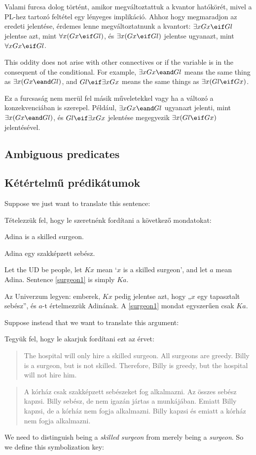 Valami furcsa dolog történt, amikor megváltoztattuk a kvantor hatókörét, mivel a PL-hez tartozó feltétel egy lényeges implikáció. Ahhoz hogy megmaradjon az eredeti jelentése, érdemes lenne megváltoztatnunk a kvantort: $\exists x Gx \eif Gl$ jelentse azt, mint $\forall x (Gx \eif Gl)$, és $\exists x (Gx \eif Gl)$ jelentse ugyanazt, mint $\forall x Gx \eif Gl$.

This oddity does not arise with other connectives or if the variable is in the consequent of the conditional. For example, $\exists x Gx \eand Gl$ means the same thing as $\exists x (Gx \eand Gl)$, and $Gl \eif \exists x Gx$ means the same things as $\exists x(Gl \eif Gx)$.

Ez a furcsaság nem merül fel másik műveletekkel vagy ha a változó a konzekvenciában is szerepel. Például, $\exists x Gx \eand Gl$ ugyanazt jelenti, mint $\exists x (Gx \eand Gl)$, és $Gl \eif \exists x Gx$ jelentése megegyezik $\exists x(Gl \eif Gx)$ jelentésével. 

\subsection*{Ambiguous predicates}
\subsection{Kétértelmű prédikátumok}

Suppose we just want to translate this sentence:

Tételezzük fel, hogy le szeretnénk fordítani a következő mondatokat:
\begin{earg}
\item[\ex{surgeon1}] Adina is a skilled surgeon.
\end{earg}
\begin{earg}
\item[\ex{surgeon1}] Adina egy szakképzett sebész.
\end{earg}
Let the UD be people, let $Kx$ mean `$x$ is a skilled surgeon', and let $a$ mean Adina. Sentence \ref{surgeon1} is simply $Ka$.

Az Univerzum legyen: emberek, $Kx$ pedig jelentse azt, hogy „$x$ egy tapasztalt sebész”, és $a$-t értelmezzük Adinának. A \ref{surgeon1} mondat egyszerűen csak $Ka$.

Suppose instead that we want to translate this argument:

Tegyük fel, hogy le akarjuk fordítani ezt az érvet:
\begin{quote}
The hospital will only hire a skilled surgeon. All surgeons are greedy. Billy is a surgeon, but is not skilled. Therefore, Billy is greedy, but the hospital will not hire him.
\end{quote}
\begin{quote}
A kórház csak szakképzett sebészeket fog alkalmazni. Az összes sebész kapzsi. Billy sebész, de nem igazán jártas a munkájában. Emiatt Billy kapzsi, de a kórház nem fogja alkalmazni. Billy kapzsi és emiatt a kórház nem fogja alkalmazni. 
\end{quote}
We need to distinguish being a \emph{skilled surgeon} from merely being a \emph{surgeon}. So we define this symbolization key:

